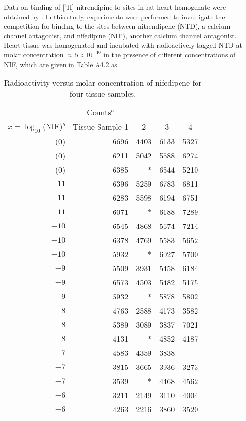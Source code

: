 Data on binding of [$^{3}$H] nitrendipine to sites in rat
heart homogenate were obtained by .
In this study, experiments were performed to investigate the competition
for binding to the sites between nitrendipene (NTD), a calcium channel
antagonist, and nifedipine (NIF), another calcium channel antagonist.
Heart tissue was homogenated and incubated with radioactively tagged
NTD at molar concentration
$\approx5 \times 10^{-10}$ in the presence of different
concentrations of NIF, which are given in Table A4.2 as
\begin{table}
  \caption{\label{atbl:ntd}
  Radioactivity versus molar concentration of nifedipene for four
  tissue samples.}
  \begin{center}
    \begin{tabular}{r r r r r}
      \hline
      &\multicolumn{1}{c}{Counts$^{a}$}\\
      \multicolumn{1}{c}{$x=\log_{10}$(NIF)$^{b}$}&
      \multicolumn{1}{c}{Tissue Sample 1}&\multicolumn{1}{c}{2}&
      \multicolumn{1}{c}{3}&\multicolumn{1}{c}{4}\\
      \hline
      (0)&6696&4403&6133&5327\\
      (0)&6211&5042&5688&6274\\
      (0)&6385&*&6544&5210\\
      $-11$&6396&5259&6783&6811\\
      $-11$&6283&5598&6194&6751\\
      $-11$&6071&*&6188&7289\\
      $-10$&6545&4868&5674&7214\\
      $-10$&6378&4769&5583&5652\\
      $-10$&5932&*&6027&5700\\
      $-9$&5509&3931&5458&6184\\
      $-9$&6573&4503&5482&5175\\
      $-9$&5932&*&5878&5802\\
      $-8$&4763&2588&4173&3582\\
      $-8$&5389&3089&3837&7021\\
      $-8$&4131&*&4852&4187\\
      $-7$&4583&4359&3838\\
      $-7$&3815&3665&3936&3273\\
      $-7$&3539&*&4468&4562\\
      $-6$&3211&2149&3110&4004\\
      $-6$&4263&2216&3860&3520\\

\end{tabular}
\end{center}
\end{table}
